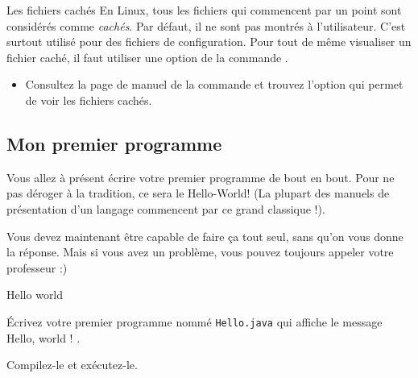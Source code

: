 \documentclass[a4paper,11pt]{article}
\begin{document}
			
		\begin{Exercice}{Les fichiers cach\'es} 
			En Linux, tous les fichiers qui commencent par un point sont consid\'er\'es comme \textit{cach\'es}.
			Par d\'efaut, il ne sont pas montr\'es \`a l'utilisateur. C'est surtout utilis\'e pour des fichiers de configuration.
			Pour tout de m\^eme visualiser un fichier cach\'e, il faut utiliser une option de la commande \verb@ls@.
		
           		 \par
			\begin{itemize}
				\item Consultez la page de manuel de la commande \verb@ls@ et trouvez l'option qui permet de voir
					les fichiers cach\'es.
			\end{itemize}
		\end{Exercice}
            		\par
        \subsection{Mon premier programme}  
  
          	Vous allez \`a pr\'esent \'ecrire votre premier programme de bout en bout. Pour ne pas d\'eroger \`a la tradition, ce sera le \guillemotleft  Hello-World! \guillemotright    
          	(La plupart des manuels de pr\'esentation d'un langage commencent par ce grand classique !).  
        
           	 \par
          
          	Vous devez maintenant \^etre capable de faire \c ca tout seul, sans qu'on vous donne la r\'eponse. Mais si vous avez un probl\`eme, vous pouvez toujours 
		appeler votre professeur :)   
        
           	 \par
        
		\clearpage	
		\begin{Tutoriel}{Hello world} 					
			\begin{steps}
				\item \'Ecrivez votre premier programme nomm\'e \verb|Hello.java| qui affiche le message  \guillemotleft  Hello, world ! \guillemotright .
				\item Compilez-le et ex\'ecutez-le.
			\end{steps}
		\end{Tutoriel}		  
        
\end{document}
